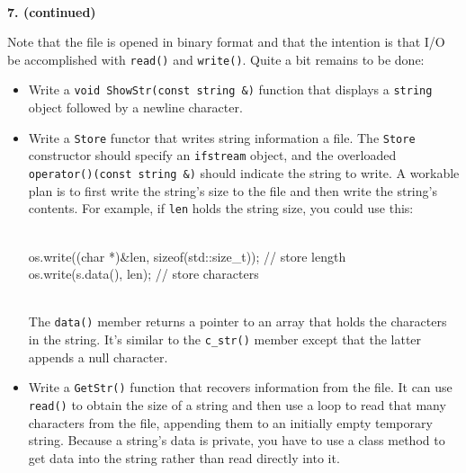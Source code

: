 \documentclass[10 pt]{amsart}
\newlength{\cwidth}
\newenvironment{cpartContinued}[2][\cwidth]
	{%
		\\ %
		\textbf{#2. (continued)}%
		\\
		\phantom{#2. }
		\begin{minipage}[t]{#1}%
		\setlength{\parindent}{0pt}%
		\setlength{\parskip}{2ex}%
	}
	{%
		\end{minipage}%
	}
\newcommand{\ttt}[1]{\texttt{#1}}
\begin{document}
	\newpage
	\begin{cpartContinued}{7}
		Note that the file is opened in binary format and that the
		intention is that I/O be accomplished with \ttt{read()} and
		\ttt{write()}.
		Quite a bit remains to be done: 
		\begin{itemize}
			\item
				Write a \ttt{void ShowStr(const string \&)} function
				that displays a \ttt{string} object followed by
				a newline character. \\
			\item
				Write a \ttt{Store} functor that writes string information
				a file. 
				The \ttt{Store} constructor should specify an \ttt{ifstream}
				object, and the overloaded \ttt{operator()(const string \&)}
				should indicate the string to write.
				A workable plan is to first write the string's size to
				the file and then write the string's contents.
				For example, if \ttt{len} holds the string size, you could
				use this:
				{\ttfamily
					\begin{tabbing}
						\hspace{9cm}\= \\
						os.write((char *)\&len, sizeof(std::size\_t)); 
							\> // store length \\
						os.write(s.data(), len); 
							\> // store characters
					\end{tabbing}
				}
				\phantom{\quad}\\
				The \ttt{data()} member returns a pointer to an array
				that holds the characters in the string.
				It's similar to the \ttt{c\_str()} member except that the
				latter appends a null character. \\
			\item
				Write a \ttt{GetStr()} function that recovers information
				from the file.
				It can use \ttt{read()} to obtain the size of a string
				and then use a loop to read that many characters from the
				file, appending them to an initially empty temporary string.
				Because a string's data is private, you have to use a
				class method to get data into the string rather than
				read directly into it.
		\end{itemize}
	\end{cpartContinued}
\end{document}
